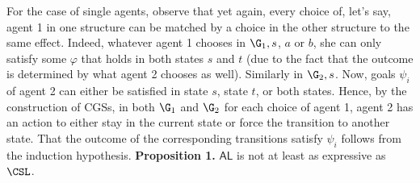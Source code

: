 For the case of single agents, observe that yet again, every choice of, let's say, agent 1 in one structure can be matched by a choice in the other structure to the same effect. Indeed, whatever agent 1 chooses in $\G_1, s$, $a$ or $b$, she can only satisfy some $\varphi$ that holds in both states $s$ and $t$ (due to the fact that the outcome is determined by what agent 2 chooses as well). Similarly in $\G_2, s$. Now, goals $\psi_i$ of agent 2 can either be satisfied in state $s$, state $t$, or both states. Hence, by the construction of CGSs, in both $\G_1$ and $\G_2$ for each choice of agent 1, agent 2 has an action to either stay in the current state or force the transition to another state. That the outcome of the corresponding transitions satisfy $\psi_i$ follows from the induction hypothesis. 
\newline
\newline
\textbf{Proposition 1.}  $\mathsf{AL}$ is not at least as expressive as $\CSL$.


